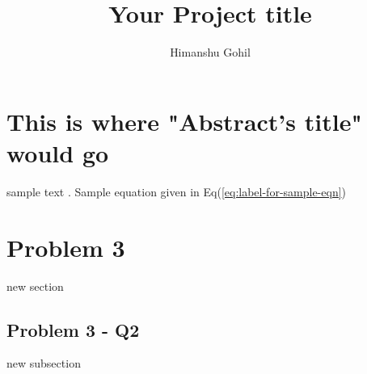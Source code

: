 \documentclass[a4paper,twoside]{article}
\title{Your Project title}
\author{Himanshu Gohil}
\numberwithin{equation}{section}
\begin{document}
\maketitle
\section*{This is where "Abstract's title" would go}
sample text \lipsum.
Sample equation given in Eq(\ref{eq:label-for-sample-eqn})

\section{Problem 3}
new section \lipsum

\subsection{Problem 3 - Q2}
new subsection \lipsum
\end{document}
